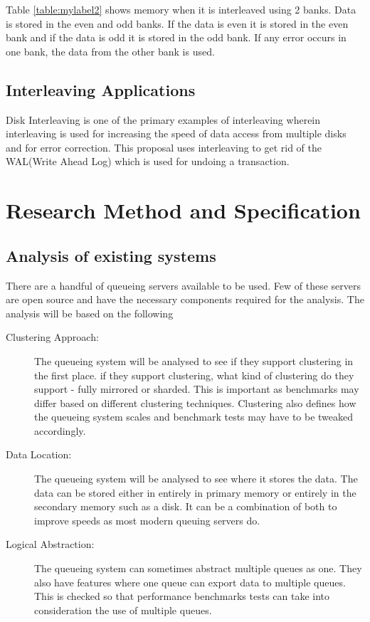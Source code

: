 \documentclass[12pt,a4paper]{article}
\begin{document}
Table \ref{table:mylabel2} shows memory when it is interleaved using 2 banks. Data is stored in the even and odd banks. If the data is even it is stored in the even bank and if the data is odd it is stored in the odd bank. If any error occurs in one bank, the data from the other bank is used. 

\subsection{Interleaving Applications}
Disk Interleaving is one of the primary examples of interleaving \citep{kim1986synchronized0} \citep{kim1991asynchronous} wherein interleaving is used for increasing the speed of data access from multiple disks and for error correction. This proposal uses interleaving to get rid of the WAL(Write Ahead Log) which is used for undoing a transaction\citep{mohan1992aries}.


\section{Research Method and Specification}



\subsection{Analysis of existing systems}

There are a handful of queueing servers available to be used. Few of these servers are open source and have the necessary components required for the analysis. The analysis will be based on the following

\begin{description}
	\item [Clustering Approach:] 
	The queueing system will be analysed to see if they support clustering in the first place. if they support clustering, what kind of clustering do they support - fully mirrored or sharded. This is important as benchmarks may differ based on different clustering techniques. Clustering also defines how the queueing system scales \citep{cattell2011scalable} and benchmark tests may have to be tweaked accordingly.
	\item [Data Location:]
	The queueing system will be analysed to see where it stores the data. The data can be stored either in entirely in primary memory or entirely in the secondary memory such as a disk. It can be a combination of both to improve speeds as most modern queuing servers do.
	\item [Logical Abstraction:]
	The queueing system can sometimes abstract multiple queues as one. They also have features where one queue can export data to multiple queues. This is checked so that performance benchmarks tests can take into consideration the use of multiple queues. 
	
\end{description}
\end{document}
